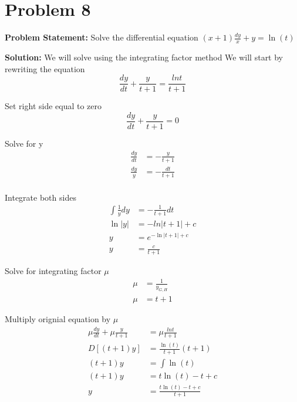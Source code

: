 \documentclass[12pt, letterpaper]{article}
\begin{document}
\section*{Problem 8}
\textbf{Problem Statement:} Solve the differential equation $(x+1)\frac{dy}{x}+y = \ln(t)$

\textbf{Solution:} We will solve using the integrating factor method
We will start by rewriting the equation
\[
\frac{dy}{dt} + \frac{y}{t+1} = \frac{lnt}{t+1}
\]

Set right side equal to zero
\[
\frac{dy}{dt} + \frac{y}{t+1} = 0
\]

Solve for y
\begin{align*}
\frac{dy}{dt} &= -\frac{y}{t+1} \\
\frac{dy}{y} &= -\frac{dt}{t+1} \\
\end{align*}

Integrate both sides
\begin{align*}
\int \frac{1}{y} dy &= -\frac{1}{t+1} dt \\
\ln|y| &= -ln|t+1| + c \\
y &= e^{-\ln|t+1| + c} \\
y&= \frac{c}{t+1}
\end{align*}

Solve for integrating factor $\mu$
\begin{align*}
\mu &= \frac{1}{y_{G,H}} \\
\mu &= t+1
\end{align*}


Multiply orignial equation by $\mu$
\begin{align*}
\mu \frac{dy}{dt} + \mu \frac{y}{t+1} &= \mu \frac{lnt}{t+1} \\
D[(t+1)y] &= \frac{\ln(t)}{t+1}(t+1) \\
(t+1)y &= \int \ln(t) \\
(t+1)y &= t\ln(t) - t + c \\
y &= \frac{t\ln(t) - t + c}{t+1}
\end{align*}
\end{document}

